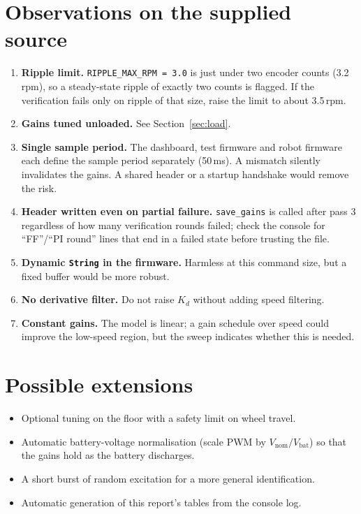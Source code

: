 \documentclass[11pt,a4paper]{report}
\newcommand{\code}[1]{\texttt{#1}}
\begin{document}
\section{Observations on the supplied source}
\begin{enumerate}
  \item \textbf{Ripple limit.} \code{RIPPLE\_MAX\_RPM = 3.0} is just under two encoder counts (3.2\,rpm), so a steady-state ripple of exactly two counts is flagged. If the verification fails only on ripple of that size, raise the limit to about 3.5\,rpm.
  \item \textbf{Gains tuned unloaded.} See Section~\ref{sec:load}.
  \item \textbf{Single sample period.} The dashboard, test firmware and robot firmware each define the sample period separately (50\,ms). A mismatch silently invalidates the gains. A shared header or a startup handshake would remove the risk.
  \item \textbf{Header written even on partial failure.} \code{save\_gains} is called after pass 3 regardless of how many verification rounds failed; check the console for ``FF''/``PI round'' lines that end in a failed state before trusting the file.
  \item \textbf{Dynamic \code{String} in the firmware.} Harmless at this command size, but a fixed buffer would be more robust.
  \item \textbf{No derivative filter.} Do not raise $K_d$ without adding speed filtering.
  \item \textbf{Constant gains.} The model is linear; a gain schedule over speed could improve the low-speed region, but the sweep indicates whether this is needed.
\end{enumerate}

\section{Possible extensions}
\begin{itemize}[noitemsep]
  \item Optional tuning on the floor with a safety limit on wheel travel.
  \item Automatic battery-voltage normalisation (scale PWM by $V_{\text{nom}}/V_{\text{bat}}$) so that the gains hold as the battery discharges.
  \item A short burst of random excitation for a more general identification.
  \item Automatic generation of this report's tables from the console log.
\end{itemize}
\end{document}
